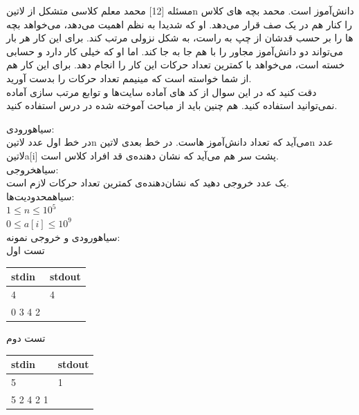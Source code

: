 ‌مسئله [12]
محمد معلم کلاسی متشکل از ‌لاتین{n} دانش‌آموز است. محمد بچه های کلاس را کنار هم در یک صف قرار می‌دهد. او که شدیدا به نظم اهمیت می‌دهد، می‌خواهد بچه ها را بر حسب قدشان از چپ به راست،‌ به شکل نزولی مرتب کند. برای این کار هر بار می‌تواند دو دانش‌آموز مجاور را با هم جا به جا کند. اما او که خیلی کار دارد و حسابی خسته است،‌ می‌خواهد با کمترین تعداد حرکات این کار را انجام دهد. برای این کار هم از شما خواسته است که مینیمم تعداد حرکات را بدست آورید.\\
دقت کنید که در این سوال از کد های آماده سایت‌ها و توابع مرتب سازی آماده نمی‌توانید استفاده کنید. هم چنین باید از مباحث آموخته شده در درس استفاده کنید.

‌سیاه{ورودی:}\\
در خط اول عدد ‌لاتین{n} می‌آید که تعداد دانش‌آموز هاست. در خط بعدی ‌لاتین{n} عدد ‌لاتین{a[i]} پشت سر هم می‌آید که نشان دهنده‌ی قد افراد کلاس است.\\
‌سیاه{خروجی:}\\
یک عدد خروجی دهید که نشان‌دهنده‌ی کمترین تعداد حرکات لازم است.\\
‌سیاه{محدودیت‌ها:}\\
$1 \leq n \leq 10^{5}$\\
$0 \leq a[i] \leq 10^{9}$\\

‌سیاه{ورودی و خروجی نمونه:}\\

تست اول
\begin{latin}
	\begin{tabularx}{\textwidth}{|X | X|}
		\hline
		\textbf{stdin} &
		\textbf{stdout}\\
		\hline
		4 & 4\\
		0 3 4 2&\\
		\hline
	\end{tabularx}
\end{latin}

تست دوم
\begin{latin}
	\begin{tabularx}{\textwidth}{|X | X|}
		\hline
		\textbf{stdin} &
		\textbf{stdout}\\
		\hline
		5 & 1\\
		5 2 4 2 1&\\
		\hline
		
	\end{tabularx}
\end{latin}



